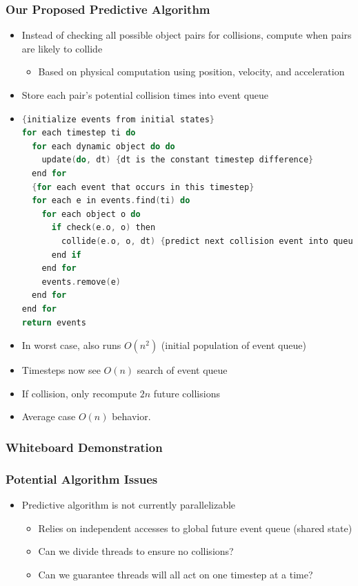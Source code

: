 \documentclass{beamer}
\begin{document}
\begin{frame}[fragile]
	\frametitle{Our Proposed Predictive Algorithm}
	\begin{itemize}
		\item Instead of checking all possible object pairs for collisions, compute when pairs are likely to collide
		\begin{itemize}
			\item Based on physical computation using position, velocity, and acceleration
		\end{itemize}
		\item Store each pair's potential collision times into event queue
		\item
	\begin{lstlisting}[language=C,basicstyle=\footnotesize,frame=single,tabsize=4,title=Predictive\_Algorithm]
{initialize events from initial states}
for each timestep ti do
  for each dynamic object do do
    update(do, dt) {dt is the constant timestep difference}
  end for
  {for each event that occurs in this timestep}
  for each e in events.find(ti) do
    for each object o do
      if check(e.o, o) then
        collide(e.o, o, dt) {predict next collision event into queue}
      end if
    end for
    events.remove(e)
  end for
end for
return events

	\end{lstlisting}
	\item In worst case, also runs $O(n ^ 2)$ (initial population of event queue)
	\item Timesteps now see $O(n)$ search of event queue
	\item If collision, only recompute $2n$ future collisions
	\item Average case $O(n)$ behavior.
	\end{itemize}

\end{frame}

\begin{frame}
  \frametitle{Whiteboard Demonstration}
\end{frame}


\begin{frame}
	\frametitle{Potential Algorithm Issues}
	\begin{itemize}
		\item Predictive algorithm is not currently parallelizable
		\begin{itemize}
			\item Relies on independent accesses to global future event queue (shared state)
			\item Can we divide threads to ensure no collisions?
			\item Can we guarantee threads will all act on one timestep at a time?
		\end{itemize}
	\end{itemize}
\end{frame}
\end{document}
